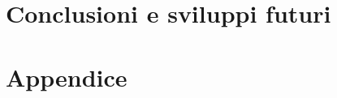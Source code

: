 \documentclass[12pt,a4paper]{report}
\begin{document}
\chapter{Conclusioni e sviluppi futuri}\label{ch:conc-svil-fut}
\lipsum[29-30]


%
%








\chapter{Appendice}\label{ch:app}
\lipsum[31-32]
\end{document}
